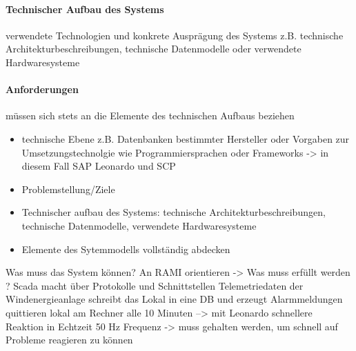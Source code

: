 \paragraph{Technischer Aufbau des Systems}
verwendete Technologien und konkrete Ausprägung des Systems
z.B. technische Architekturbeschreibungen, technische Datenmodelle oder verwendete Hardwaresysteme

\paragraph{Anforderungen}
müssen sich stets an die Elemente des technischen Aufbaus beziehen
\begin{itemize}
  \item technische Ebene z.B. Datenbanken bestimmter Hersteller oder Vorgaben zur Umsetzungstechnolgie wie Programmiersprachen oder Frameworks -> in diesem Fall SAP Leonardo und SCP
  \item Problemstellung/Ziele
  \item Technischer aufbau des Systems: technische Architekturbeschreibungen, technische Datenmodelle, verwendete Hardwaresysteme
  \item Elemente des Sytemmodells vollständig abdecken
\end{itemize}



Was muss das System können? An RAMI orientieren -> Was muss erfüllt werden ?
Scada macht über Protokolle und Schnittstellen Telemetriedaten der Windenergieanlage
schreibt das Lokal in eine DB und erzeugt Alarmmeldungen
quittieren lokal am Rechner
alle 10 Minuten --> mit Leonardo schnellere Reaktion in Echtzeit
50 Hz Frequenz -> muss gehalten werden, um schnell auf Probleme reagieren zu können


